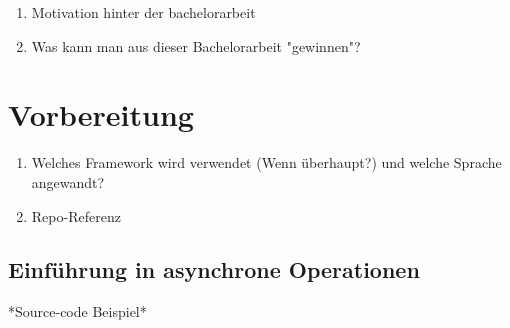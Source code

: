 \begin{enumerate} 
\item Motivation hinter der bachelorarbeit
\item Was kann man aus dieser Bachelorarbeit "gewinnen"?
\end{enumerate}

\section{Vorbereitung}
\begin{enumerate} 
\item Welches Framework wird verwendet (Wenn überhaupt?) und welche Sprache angewandt?
\item Repo-Referenz
\end{enumerate}

\subsection{Einführung in asynchrone Operationen}
*Source-code Beispiel*